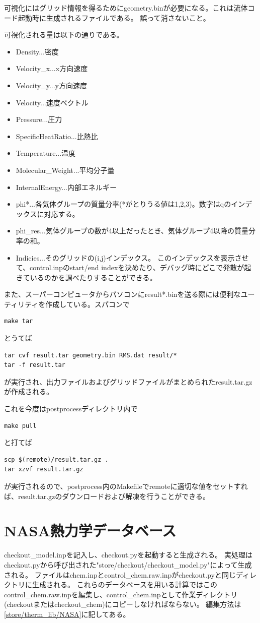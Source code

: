 \documentclass{jsarticle}
\begin{document}
可視化にはグリッド情報を得るためにgeometry.binが必要になる。これは流体コード起動時に生成されるファイルである。
誤って消さないこと。

可視化される量は以下の通りである。
\begin{itemize}
\item Density...密度
\item Velocity\_x...x方向速度
\item Velocity\_y...y方向速度
\item Velocity...速度ベクトル
\item Pressure...圧力
\item SpecificHeatRatio...比熱比
\item Temperature...温度
\item Molecular\_Weight...平均分子量
\item InternalEnergy...内部エネルギー
\item phi*...各気体グループの質量分率(*がとりうる値は1,2,3)。数字はqのインデックスに対応する。
\item phi\_res...気体グループの数が4以上だったとき、気体グループ4以降の質量分率の和。
\item Indicies...そのグリッドの(i,j)インデックス。
このインデックスを表示させて、control.inpのstart/end indexを決めたり、デバッグ時にどこで発散が起きているのかを調べたりすることができる。
\end{itemize}

また、スーパーコンピュータからパソコンにresult*.binを送る際には便利なユーティリティを作成している。スパコンで
\begin{verbatim}
make tar
\end{verbatim}
とうてば
\begin{verbatim}
tar cvf result.tar geometry.bin RMS.dat result/*
tar -f result.tar
\end{verbatim}
が実行され、出力ファイルおよびグリッドファイルがまとめられたresult.tar.gzが作成される。

これを今度はpostprocessディレクトリ内で
\begin{verbatim}
make pull
\end{verbatim}
と打てば
\begin{verbatim}
scp $(remote)/result.tar.gz .
tar xzvf result.tar.gz
\end{verbatim}
が実行されるので、postprocess内のMakefileでremoteに適切な値をセットすれば、result.tar.gzのダウンロードおよび解凍を行うことができる。
\newpage
\section{NASA熱力学データベース}%
checkout\_model.inpを記入し、checkout.pyを起動すると生成される。
実処理はcheckout.pyから呼び出された"store/checkout/checkout\_model.py"によって生成される。
ファイルはchem.inpとcontrol\_chem.raw.inpがcheckout.pyと同じディレクトリに生成される。
これらのデータベースを用いる計算ではこのcontrol\_chem.raw.inpを編集し、control\_chem.inpとして作業ディレクトリ(checkoutまたはcheckout\_chem)にコピーしなければならない。
編集方法は\ref{store/therm_lib/NASA}に記してある。
\end{document}
